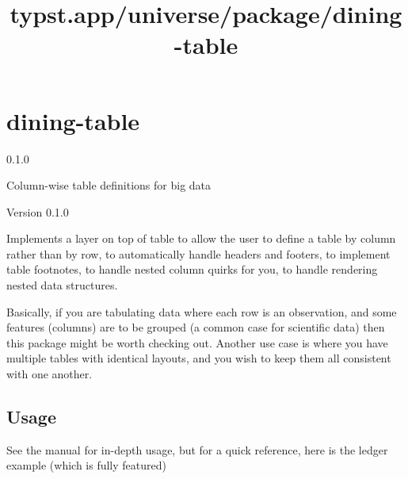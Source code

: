 \title{typst.app/universe/package/dining-table}

\label{banner}
\section{dining-table}\label{dining-table}

{ 0.1.0 }

Column-wise table definitions for big data

\label{readme}
Version 0.1.0

Implements a layer on top of table to allow the user to define a table
by column rather than by row, to automatically handle headers and
footers, to implement table footnotes, to handle nested column quirks
for you, to handle rendering nested data structures.

Basically, if you are tabulating data where each row is an observation,
and some features (columns) are to be grouped (a common case for
scientific data) then this package might be worth checking out. Another
use case is where you have multiple tables with identical layouts, and
you wish to keep them all consistent with one another.


\subsection{Usage}\label{usage}

See the manual for in-depth usage, but for a quick reference, here is
the ledger example (which is fully featured)

